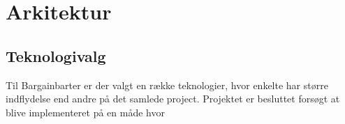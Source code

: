 \chapter{Arkitektur}

\section{Teknologivalg}

Til Bargainbarter er der valgt en række teknologier, hvor enkelte har større indflydelse end andre på det samlede project. Projektet er besluttet forsøgt at blive implementeret på en måde hvor 